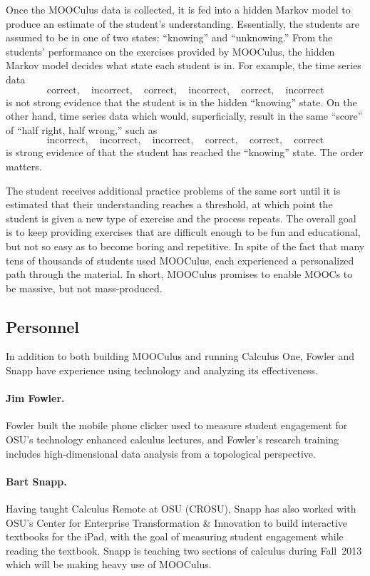 \documentclass[12pt]{article}
\begin{document}
Once the MOOCulus data is collected, it is fed into a hidden Markov
model to produce an estimate of the student's
understanding. Essentially, the students are assumed to be in one of
two states: ``knowing'' and ``unknowing.''  From the students'
performance on the exercises provided by MOOCulus, the hidden Markov
model decides what state each student is in.  For example, the time series data
$$
\mbox{correct},\quad\mbox{incorrect},\quad\mbox{correct},\quad\mbox{incorrect},\quad\mbox{correct},\quad\mbox{incorrect}
$$
is not strong evidence that the student is in the hidden ``knowing''
state.  On the other hand, time series data which would,
superficially, result in the same ``score'' of ``half right, half wrong,'' such as
$$
\mbox{incorrect},\quad\mbox{incorrect},\quad\mbox{incorrect},\quad\mbox{correct},\quad\mbox{correct},\quad\mbox{correct}
$$
is strong evidence of that the student has reached the ``knowing''
state.  The order matters.

The student receives additional practice problems of the same sort
until it is estimated that their understanding reaches a threshold, at
which point the student is given a new type of exercise and the
process repeats.  The overall goal is to keep providing exercises that
are difficult enough to be fun and educational, but not so easy as to
become boring and repetitive.  In spite of the fact that many tens of
thousands of students used MOOCulus, each experienced a personalized
path through the material.  In short, MOOCulus promises to enable
MOOCs to be massive, but not mass-produced.

\subsection*{Personnel}

In addition to both building MOOCulus and running Calculus One, Fowler
and Snapp have experience using technology and analyzing its
effectiveness.

\paragraph*{Jim Fowler.} Fowler built the mobile phone
clicker used to measure student engagement for OSU's technology
enhanced calculus lectures, and Fowler's research training includes
high-dimensional data analysis from a topological perspective.

\paragraph*{Bart Snapp.} Having taught Calculus Remote at OSU (CROSU),
Snapp has also worked with OSU's Center for Enterprise Transformation
\& Innovation to build interactive textbooks for the iPad, with the
goal of measuring student engagement while reading the textbook.
Snapp is teaching two sections of calculus during Fall~2013 which will
be making heavy use of MOOCulus.
\end{document}

